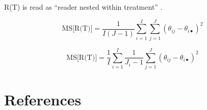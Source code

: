 \documentclass[
]{book}
\begin{document}
R(T) is read as ``reader nested within treatment'' \citep{RN2508}.

\begin{equation}
\text{MS[R(T)]}=\frac{1}{I(J-1)}\sum_{i=1}^{I}\sum_{j=1}^{J}\left ( \theta_{ij} - \theta_{i\bullet} \right )^{2}
\label{eq:MSR-T-Hillis}
\end{equation}

\begin{equation}
\text{MS[R(T)]}=\frac{1}{I}\sum_{i=1}^{I}\frac{1}{J_i-1}\sum_{j=1}^{J}\left ( \theta_{ij} - \theta_{i\bullet} \right )^{2}
\label{eq:MSR-T-Hillis-Modified}
\end{equation}

\hypertarget{SplitPlotChapter-references}{%
\section{References}\label{SplitPlotChapter-references}}

  
\end{document}
